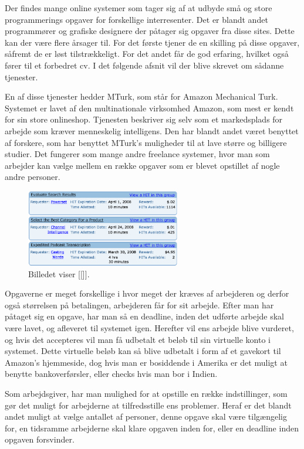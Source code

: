 Der findes mange online systemer som tager sig af at udbyde små og store programmerings opgaver for forskellige interresenter. Det er blandt andet programmører og grafiske designere der påtager sig opgaver fra disse sites. Dette kan der være flere årsager til. For det første tjener de en skilling på disse opgaver, såfremt de er løst tilstrækkeligt. For det andet får de god erfaring, hvilket også fører til et forbedret cv. I det følgende afsnit vil der blive skrevet om sådanne tjenester.

En af disse tjenester hedder MTurk, som står for Amazon Mechanical Turk. Systemet er lavet af den multinationale virksomhed Amazon, som mest er kendt for sin store onlineshop. Tjenesten beskriver sig selv som et markedsplads for arbejde som kræver menneskelig intelligens.\cite{MTurk} Den har blandt andet været benyttet af forskere, som har benyttet MTurk's muligheder til at lave større og billigere studier.\cite{Sciencemag} Det fungerer som mange andre freelance systemer, hvor man som arbejder kan vælge mellem en række opgaver som er blevet opstillet af nogle andre personer.

\begin{figure}[htb]
\centering
\includegraphics[width=0.6\textwidth]{Billeder/MTurk.png}
\caption{\cite{MTurkIMG} Billedet viser [[]].}
\label{MTurkILL}
\end{figure}

Opgaverne er meget forskellige i hvor meget der kræves af arbejderen og derfor også størrelsen på betalingen, arbejderen får for sit arbejde. Efter man har påtaget sig en opgave, har man så en deadline, inden det udførte arbejde skal være lavet, og afleveret til systemet igen. Herefter vil ens arbejde blive vurderet, og hvis det accepteres vil man få udbetalt et beløb til sin virtuelle konto i systemet. Dette virtuelle beløb kan så blive udbetalt i form af et gavekort til Amazon’s hjemmeside, dog hvis man er bosiddende i Amerika er det muligt at benytte bankoverførsler, eller checks hvis man bor i Indien.\cite{MTurk2}

Som arbejdsgiver, har man mulighed for at opstille en række indstillinger, som gør det muligt for arbejderne at tilfredsstille ens problemer. Heraf er det blandt andet muligt at vælge antallet af personer, denne opgave skal være tilgængelig for, en tidsramme arbejderne skal klare opgaven inden for, eller en deadline inden opgaven forsvinder.

